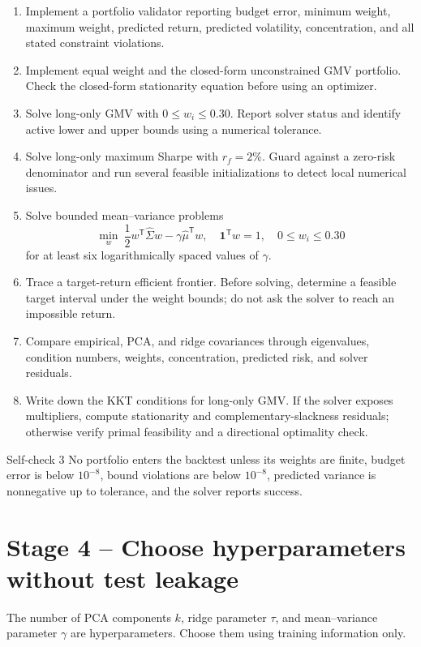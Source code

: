 \documentclass[10pt]{article}
\newcommand{\trans}{^{\mathsf T}}
\begin{document}
\begin{enumerate}[label=\textbf{3.\arabic*.}]
\item Implement a portfolio validator reporting budget error, minimum weight,
maximum weight, predicted return, predicted volatility, concentration, and
all stated constraint violations.
\item Implement equal weight and the closed-form unconstrained GMV portfolio.
Check the closed-form stationarity equation before using an optimizer.
\item Solve long-only GMV with $0\leq w_i\leq0.30$. Report solver status and
identify active lower and upper bounds using a numerical tolerance.
\item Solve long-only maximum Sharpe with $r_f=2\%$. Guard against a zero-risk
denominator and run several feasible initializations to detect local numerical
issues.
\item Solve bounded mean--variance problems
\[
\min_w\ \frac12w\trans\widehat\Sigma w-\gamma\widehat\mu\trans w,
\quad \mathbf1\trans w=1,\quad0\leq w_i\leq0.30
\]
for at least six logarithmically spaced values of $\gamma$.
\item Trace a target-return efficient frontier. Before solving, determine a
feasible target interval under the weight bounds; do not ask the solver to
reach an impossible return.
\item Compare empirical, PCA, and ridge covariances through eigenvalues,
condition numbers, weights, concentration, predicted risk, and solver
residuals.
\item Write down the KKT conditions for long-only GMV. If the solver exposes
multipliers, compute stationarity and complementary-slackness residuals;
otherwise verify primal feasibility and a directional optimality check.
\end{enumerate}

\begin{checkpointbox}{Self-check 3}
No portfolio enters the backtest unless its weights are finite, budget error is
below $10^{-8}$, bound violations are below $10^{-8}$, predicted variance is
nonnegative up to tolerance, and the solver reports success.
\end{checkpointbox}

\section{Stage 4 -- Choose hyperparameters without test leakage}

The number of PCA components $k$, ridge parameter $\tau$, and mean--variance
parameter $\gamma$ are hyperparameters. Choose them using training information
only.
\end{document}
